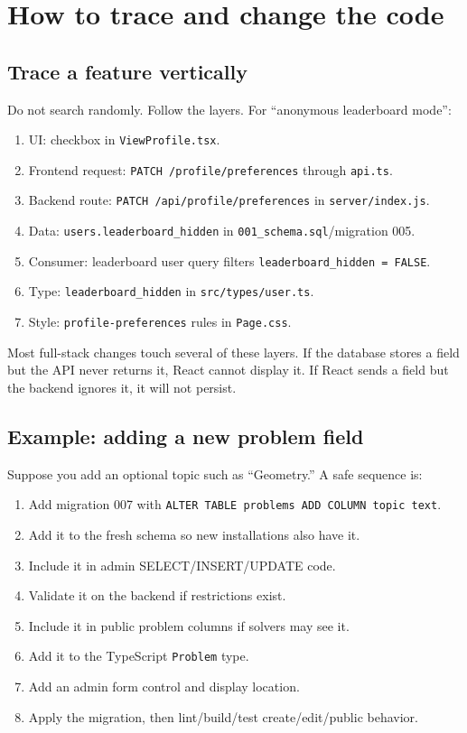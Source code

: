 \documentclass[11pt,oneside]{book}
\newcommand{\file}[1]{\texttt{#1}}
\newcommand{\route}[1]{\texttt{#1}}
\newcommand{\code}[1]{\texttt{#1}}
\begin{document}
\chapter{How to trace and change the code}

\section{Trace a feature vertically}
Do not search randomly. Follow the layers. For ``anonymous leaderboard mode'':
\begin{enumerate}
  \item UI: checkbox in \file{ViewProfile.tsx}.
  \item Frontend request: \route{PATCH /profile/preferences} through \file{api.ts}.
  \item Backend route: \route{PATCH /api/profile/preferences} in \file{server/index.js}.
  \item Data: \code{users.leaderboard\_hidden} in \file{001\_schema.sql}/migration 005.
  \item Consumer: leaderboard user query filters \code{leaderboard\_hidden = FALSE}.
  \item Type: \code{leaderboard\_hidden} in \file{src/types/user.ts}.
  \item Style: \code{profile-preferences} rules in \file{Page.css}.
\end{enumerate}

Most full-stack changes touch several of these layers. If the database stores a field but the API never returns it, React cannot display it. If React sends a field but the backend ignores it, it will not persist.

\section{Example: adding a new problem field}
Suppose you add an optional topic such as ``Geometry.'' A safe sequence is:
\begin{enumerate}
  \item Add migration 007 with \code{ALTER TABLE problems ADD COLUMN topic text}.
  \item Add it to the fresh schema so new installations also have it.
  \item Include it in admin SELECT/INSERT/UPDATE code.
  \item Validate it on the backend if restrictions exist.
  \item Include it in public problem columns if solvers may see it.
  \item Add it to the TypeScript \code{Problem} type.
  \item Add an admin form control and display location.
  \item Apply the migration, then lint/build/test create/edit/public behavior.
\end{enumerate}
\end{document}
